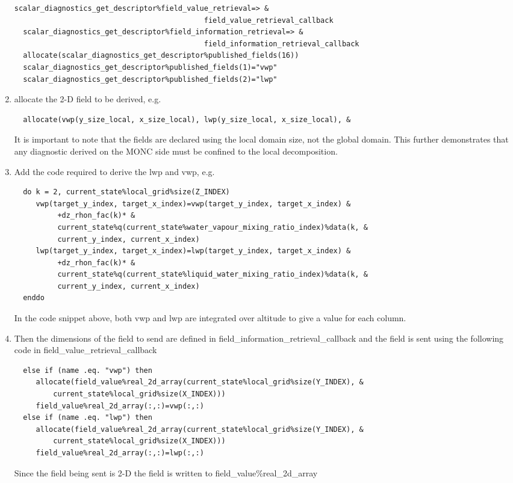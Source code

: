 \documentclass[a4paper,11pt]{article}
\begin{document}
\begin{enumerate}
{  \begin{lstlisting}[caption={code snippet from scalar\_diagnostics, which
    shows the allocation of water path published fields}]
  scalar_diagnostics_get_descriptor%field_value_retrieval=> &
                                            field_value_retrieval_callback
  scalar_diagnostics_get_descriptor%field_information_retrieval=> &
                                            field_information_retrieval_callback
  allocate(scalar_diagnostics_get_descriptor%published_fields(16))
  scalar_diagnostics_get_descriptor%published_fields(1)="vwp"
  scalar_diagnostics_get_descriptor%published_fields(2)="lwp"
  \end{lstlisting}
  }
  \item{allocate the 2-D field to be derived, e.g.
  \begin{lstlisting}
  allocate(vwp(y_size_local, x_size_local), lwp(y_size_local, x_size_local), &
  \end{lstlisting}
  It is important to note that the fields are declared using the local
  domain size, not the global domain. This further demonstrates that any
  diagnostic derived on the MONC side must be confined to the local decomposition.
  }
  \item{Add the code required to derive the lwp and vwp, e.g.
  \begin{lstlisting}
  do k = 2, current_state%local_grid%size(Z_INDEX)
     vwp(target_y_index, target_x_index)=vwp(target_y_index, target_x_index) &
          +dz_rhon_fac(k)* &
          current_state%q(current_state%water_vapour_mixing_ratio_index)%data(k, &
          current_y_index, current_x_index)
     lwp(target_y_index, target_x_index)=lwp(target_y_index, target_x_index) &
          +dz_rhon_fac(k)* &
          current_state%q(current_state%liquid_water_mixing_ratio_index)%data(k, &
          current_y_index, current_x_index)
  enddo
  \end{lstlisting}
  In the code snippet above, both vwp and lwp are integrated over altitude to
  give a value for each column.
  }
  \item{
  Then the dimensions of the field to send are defined in
  field\_information\_retrieval\_callback and the field is sent using
  the following code in field\_value\_retrieval\_callback
  \begin{lstlisting}
  else if (name .eq. "vwp") then
     allocate(field_value%real_2d_array(current_state%local_grid%size(Y_INDEX), &
         current_state%local_grid%size(X_INDEX)))
     field_value%real_2d_array(:,:)=vwp(:,:)
  else if (name .eq. "lwp") then
     allocate(field_value%real_2d_array(current_state%local_grid%size(Y_INDEX), &
         current_state%local_grid%size(X_INDEX)))
     field_value%real_2d_array(:,:)=lwp(:,:)
  \end{lstlisting}
  Since the field being sent is 2-D the field is written to
  field\_value\%real\_2d\_array
  }
\end{enumerate}
\end{document}
